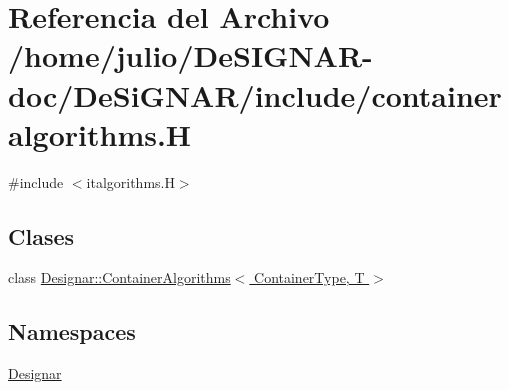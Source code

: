 \hypertarget{containeralgorithms_8_h}{}\section{Referencia del Archivo /home/julio/\+De\+S\+I\+G\+N\+A\+R-\/doc/\+De\+Si\+G\+N\+A\+R/include/containeralgorithms.H}
\label{containeralgorithms_8_h}
{\ttfamily \#include $<$italgorithms.\+H$>$}\newline
\subsection*{Clases}
\begin{DoxyCompactItemize}
\item 
class \hyperlink{class_designar_1_1_container_algorithms}{Designar\+::\+Container\+Algorithms$<$ Container\+Type, T $>$}
\end{DoxyCompactItemize}
\subsection*{Namespaces}
\begin{DoxyCompactItemize}
\item 
 \hyperlink{namespace_designar}{Designar}
\end{DoxyCompactItemize}
